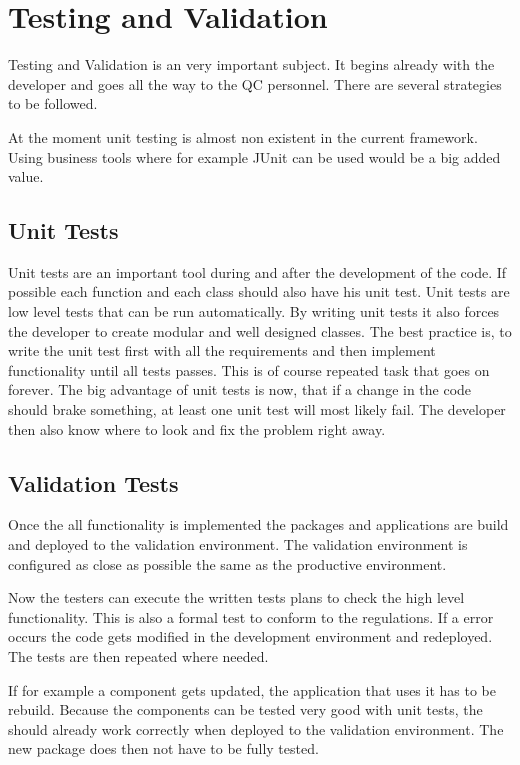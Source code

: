 \documentclass[paper=a4,twoside=false,BCOR=0mm,DIV=calc,fontsize=12pt]{scrartcl}
\begin{document}
\section{Testing and Validation}
Testing and Validation is an very important subject. It begins already with the developer and goes all the way to the QC personnel.
There are several strategies to be followed.

At the moment unit testing is almost non existent in the current framework. Using business tools where for example JUnit \cite{junit} can be used would be a big added value.

\subsection{Unit Tests}
Unit tests are an important tool during and after the development of the code. If possible each function and each class should also have his unit test. 
Unit tests are low level tests that can be run automatically. By writing unit tests it also forces the developer to create modular and well designed classes.
The best practice is, to write the unit test first with all the requirements and then implement functionality until all tests passes. This is of course repeated task 
that goes on forever.
The big advantage of unit tests is now, that if a change in the code should brake something, at least one unit test will most likely fail.
The developer then also know where to look and fix the problem right away.

\subsection{Validation Tests}
Once the all functionality is implemented the packages and applications are build and deployed to the validation environment. The validation environment is configured as 
close as possible the same as the productive environment.

Now the testers can execute the written tests plans to check the high level functionality. This is also a formal test to conform to the regulations. If a error occurs 
the code gets modified in the development environment and redeployed. The tests are then repeated where needed.

If for example a component gets updated, the application that uses it has to be rebuild. Because the components can be tested very good with unit tests, the should already work correctly when deployed to the validation environment.
The new package does then not have to be fully tested.
\end{document}
